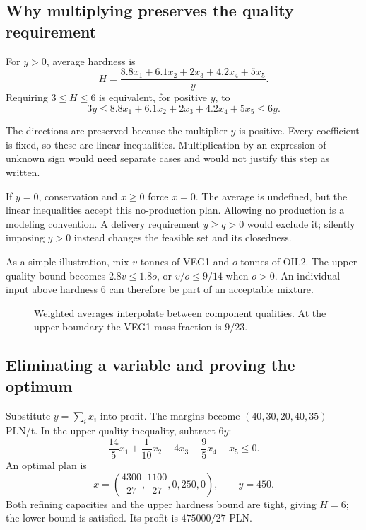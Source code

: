 \documentclass[11pt,a4paper]{article}
\begin{document}
\subsection{Why multiplying preserves the quality requirement}
\begin{lecturecore}
  For $y>0$, average hardness is
  \[
    H=\frac{8.8x_1+6.1x_2+2x_3+4.2x_4+5x_5}{y}.
  \]
  Requiring $3\leq H\leq6$ is equivalent, for positive $y$, to
  \begin{equation}\label{eq:quality}
    3y\leq8.8x_1+6.1x_2+2x_3+4.2x_4+5x_5\leq6y.
  \end{equation}
\end{lecturecore}
The directions are preserved because the multiplier $y$ is positive. Every
coefficient is fixed, so these are linear inequalities. Multiplication by an
expression of unknown sign would need separate cases and would not justify
this step as written.

If $y=0$, conservation and $x\geq0$ force $x=0$. The average is undefined,
but the linear inequalities accept this no-production plan. Allowing no production
is a modeling convention. A delivery requirement $y\geq q>0$ would exclude it;
silently imposing $y>0$ instead changes the feasible set and its closedness.

As a simple illustration, mix $v$ tonnes of VEG1 and $o$ tonnes of OIL2.
The upper-quality bound becomes $2.8v\leq1.8o$, or $v/o\leq9/14$ when $o>0$.
An individual input above hardness $6$ can therefore be part of an acceptable mixture.
\begin{figure}[H]
  \centering
  \caption{Weighted averages interpolate between component qualities.
    At the upper boundary the VEG1 mass fraction is $9/23$.}\label{fig:hardness}
\end{figure}

\subsection{Eliminating a variable and proving the optimum}
Substitute $y=\sum_i x_i$ into profit. The margins become
$(40,30,20,40,35)$ PLN/t. In the upper-quality inequality, subtract $6y$:
\[
  \frac{14}{5}x_1+\frac1{10}x_2-4x_3-\frac95x_4-x_5\leq0.
\]
An optimal plan is
\begin{equation}\label{eq:blend-optimum}
  x=\left(\frac{4300}{27},\frac{1100}{27},0,250,0\right),\qquad y=450.
\end{equation}
Both refining capacities and the upper hardness bound are tight, giving $H=6$;
the lower bound is satisfied. Its profit is $475000/27$ PLN.
\end{document}
